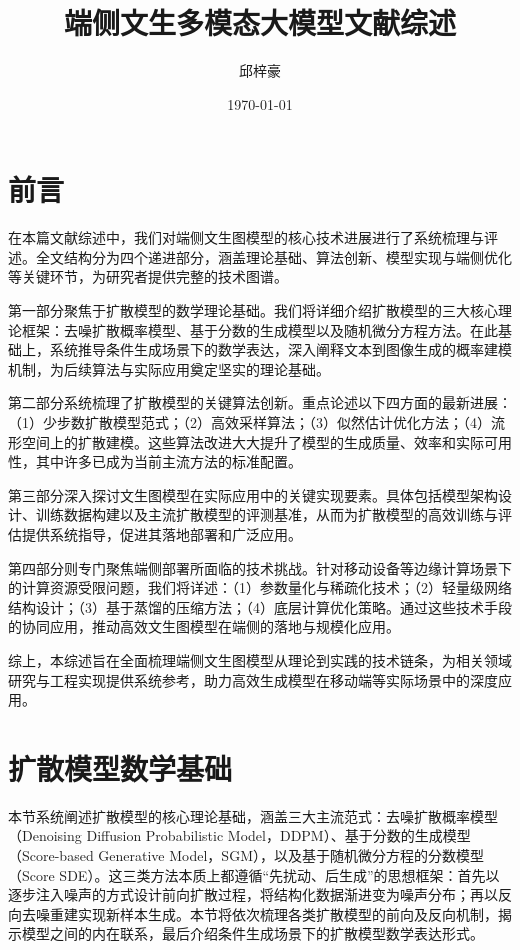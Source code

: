 \documentclass[11pt,a4paper,UTF8]{ctexart}
\title{端侧文生多模态大模型文献综述}
\author{邱梓豪}
\date{\today}
\begin{document}
\maketitle
\tableofcontents
\newpage

\section{前言}

在本篇文献综述中，我们对端侧文生图模型的核心技术进展进行了系统梳理与评述。全文结构分为四个递进部分，涵盖理论基础、算法创新、模型实现与端侧优化等关键环节，为研究者提供完整的技术图谱。

第一部分聚焦于扩散模型的数学理论基础。我们将详细介绍扩散模型的三大核心理论框架：去噪扩散概率模型、基于分数的生成模型以及随机微分方程方法。在此基础上，系统推导条件生成场景下的数学表达，深入阐释文本到图像生成的概率建模机制，为后续算法与实际应用奠定坚实的理论基础。

第二部分系统梳理了扩散模型的关键算法创新。重点论述以下四方面的最新进展：（1）少步数扩散模型范式；（2）高效采样算法；（3）似然估计优化方法；（4）流形空间上的扩散建模。这些算法改进大大提升了模型的生成质量、效率和实际可用性，其中许多已成为当前主流方法的标准配置。

第三部分深入探讨文生图模型在实际应用中的关键实现要素。具体包括模型架构设计、训练数据构建以及主流扩散模型的评测基准，从而为扩散模型的高效训练与评估提供系统指导，促进其落地部署和广泛应用。

第四部分则专门聚焦端侧部署所面临的技术挑战。针对移动设备等边缘计算场景下的计算资源受限问题，我们将详述：（1）参数量化与稀疏化技术；（2）轻量级网络结构设计；（3）基于蒸馏的压缩方法；（4）底层计算优化策略。通过这些技术手段的协同应用，推动高效文生图模型在端侧的落地与规模化应用。

综上，本综述旨在全面梳理端侧文生图模型从理论到实践的技术链条，为相关领域研究与工程实现提供系统参考，助力高效生成模型在移动端等实际场景中的深度应用。

\newpage

\section{扩散模型数学基础}

本节系统阐述扩散模型的核心理论基础，涵盖三大主流范式：去噪扩散概率模型（Denoising Diffusion Probabilistic Model，DDPM）\cite{sohldickstein2015diffusion,ho2020denoising}、基于分数的生成模型（Score-based Generative Model，SGM）\cite{song2019generative,song2020improved}，以及基于随机微分方程的分数模型（Score SDE）\cite{song2020score,karras2022elucidating}。这三类方法本质上都遵循“先扰动、后生成”的思想框架：首先以逐步注入噪声的方式设计前向扩散过程，将结构化数据渐进变为噪声分布；再以反向去噪重建实现新样本生成。本节将依次梳理各类扩散模型的前向及反向机制，揭示模型之间的内在联系，最后介绍条件生成场景下的扩散模型数学表达形式。
\end{document}
